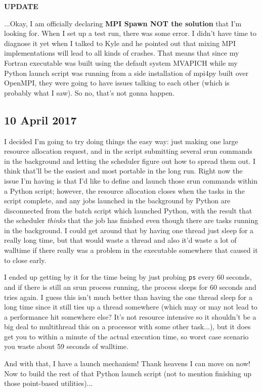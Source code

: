 \documentclass[]{report}
\begin{document}
\noindent\textbf{UPDATE}

...Okay, I am officially declaring \textbf{MPI Spawn NOT the solution} that I'm looking for. When I set up a test run, there was some error. I didn't have time to diagnose it yet when I talked to Kyle and he pointed out that mixing MPI implementations will lead to all kinds of crashes. That means that since my Fortran executable was built using the default system MVAPICH while my Python launch script was running from a side installation of mpi4py built over OpenMPI, they were going to have issues talking to each other (which is probably what I saw). So no, that's not gonna happen.

\subsection*{10 April 2017}
I decided I'm going to try doing things the easy way: just making one large resource allocation request, and in the script submitting several srun commands in the background and letting the scheduler figure out how to spread them out. I think that'll be the easiest and most portable in the long run. Right now the issue I'm having is that I'd like to define and launch those srun commands within a Python script; however, the resource allocation closes when the tasks in the script complete, and any jobs launched in the background by Python are disconnected from the batch script which launched Python, with the result that the scheduler \textit{thinks} that the job has finished even though there are tasks running in the background. I could get around that by having one thread just sleep for a really long time, but that would waste a thread and also it'd waste a lot of walltime if there really was a problem in the executable somewhere that caused it to close early.

I ended up getting by it for the time being by just probing \texttt{ps} every 60 seconds, and if there is still an srun process running, the process sleeps for 60 seconds and tries again. I guess this isn't much better than having the one thread sleep for a long time since it still ties up a thread somewhere (which may or may not lead to a performance hit somewhere else? It's not resource intensive so it shouldn't be a big deal to multithread this on a processor with some other task...), but it does get you to within a minute of the actual execution time, so worst case scenario you waste about 59 seconds of walltime.

And with that, I have a launch mechanism! Thank heavens I can move on now! Now to build the rest of that Python launch script (not to mention finishing up those point-based utilities)...
\end{document}
